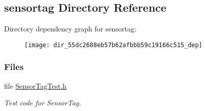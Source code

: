\subsection{sensortag Directory Reference}
\label{dir_55dc2688eb57b62afbbb59c19166c515}
Directory dependency graph for sensortag\+:
\nopagebreak
\begin{figure}[H]
\begin{center}
\leavevmode
\texttt{[image: dir\_55dc2688eb57b62afbbb59c19166c515\_dep]}
\end{center}
\end{figure}
\subsubsection*{Files}
\begin{DoxyCompactItemize}
\item 
file \hyperlink{_sensor_tag_test_8h}{Sensor\+Tag\+Test.\+h}
\begin{DoxyCompactList}\small\item\em Test code for Sensor\+Tag. \end{DoxyCompactList}\end{DoxyCompactItemize}
